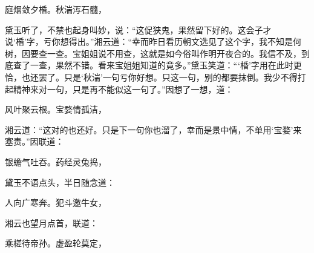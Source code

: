 \begin{poem}
    \begin{pl}

        庭烟敛夕棔。秋湍泻石髓，
    \end{pl}
\end{poem}

\begin{parag}

    黛玉听了，不禁也起身叫妙，说：“这促狭鬼，果然留下好的。这会子才说‘棔’字，亏你想得出。”湘云道：“幸而昨日看历朝文选见了这个字，我不知是何树，因要查一查。宝姐姐说不用查，这就是如今俗叫作明开夜合的。我信不及，到底查了一查，果然不错。看来宝姐姐知道的竟多。”黛玉笑道：“‘棔’字用在此时更恰，也还罢了。只是‘秋湍’一句亏你好想。只这一句，别的都要抹倒。我少不得打起精神来对一句，只是再不能似这一句了。”因想了一想，道：
\end{parag}

\begin{poem}
    \begin{pl}
        风叶聚云根。宝婺情孤洁，
    \end{pl}
\end{poem}

\begin{parag}

    湘云道：“这对的也还好。只是下一句你也溜了，幸而是景中情，不单用‘宝婺’来塞责。”因联道：
\end{parag}
\begin{poem}
    \begin{pl}
        银蟾气吐吞。药经灵兔捣，
    \end{pl}
\end{poem}
\begin{parag}

    黛玉不语点头，半日随念道：
\end{parag}
\begin{poem}
    \begin{pl}
        人向广寒奔。犯斗邀牛女，
    \end{pl}
\end{poem}

\begin{parag}

    湘云也望月点首，联道：
\end{parag}
\begin{poem}
    \begin{pl}
        乘槎待帝孙。虚盈轮莫定，
    \end{pl}
\end{poem}


